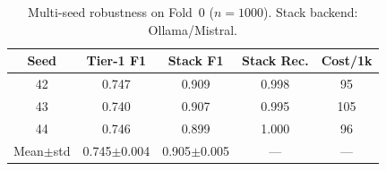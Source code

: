 \begin{table}[!t]
\centering
\caption{Multi-seed robustness on Fold~0 ($n{=}1000$). Stack backend: Ollama/Mistral.}
\label{tab:seeds}
\begin{tabular}{ccccc}
\toprule
Seed & Tier-1 F1 & Stack F1 & Stack Rec. & Cost/1k \\
\midrule
42 & 0.747 & 0.909 & 0.998 & 95 \\
43 & 0.740 & 0.907 & 0.995 & 105 \\
44 & 0.746 & 0.899 & 1.000 & 96 \\
\midrule
Mean$\pm$std & 0.745$\pm$0.004 & 0.905$\pm$0.005 & --- & --- \\
\bottomrule
\end{tabular}
\end{table}
